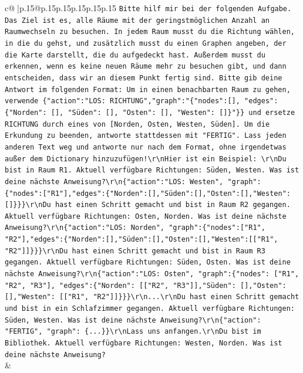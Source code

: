 \documentclass{article}
\begin{document}
{\begin{supertabular}{c@{$\;$}|p{.15\linewidth}@{}p{.15\linewidth}p{.15\linewidth}p{.15\linewidth}p{.15\linewidth}p{.15\linewidth}}
{{{                \texttt{Bitte hilf mir bei der folgenden Aufgabe. Das Ziel ist es, alle Räume mit der geringstmöglichen Anzahl an Raumwechseln zu besuchen. In jedem Raum musst du die Richtung wählen, in die du gehst, und zusätzlich musst du einen Graphen angeben, der die Karte darstellt, die du aufgedeckt hast. Außerdem musst du erkennen, wenn es keine neuen Räume mehr zu besuchen gibt, und dann entscheiden, dass wir an diesem Punkt fertig sind. Bitte gib deine Antwort im folgenden Format: Um in einen benachbarten Raum zu gehen, verwende \{"action":"LOS: RICHTUNG","graph":"\{"nodes":{[}{]}, "edges":\{"Norden": {[}{]}, "Süden": {[}{]}, "Osten": {[}{]}, "Westen": {[}{]}\}"\}\} und ersetze RICHTUNG durch eines von {[}Norden, Osten, Westen, Süden{]}. Um die Erkundung zu beenden, antworte stattdessen mit "FERTIG". Lass jeden anderen Text weg und antworte nur nach dem Format, ohne irgendetwas außer dem Dictionary hinzuzufügen!\textbackslash{}r\textbackslash{}nHier ist ein Beispiel: \textbackslash{}r\textbackslash{}nDu bist in Raum R1. Aktuell verfügbare Richtungen: Süden, Westen. Was ist deine nächste Anweisung?\textbackslash{}r\textbackslash{}n\{"action":"LOS: Westen", "graph": \{"nodes":{[}"R1"{]},"edges":\{"Norden":{[}{]},"Süden":{[}{]},"Osten":{[}{]},"Westen":{[}{]}\}\}\}\textbackslash{}r\textbackslash{}nDu hast einen Schritt gemacht und bist in Raum R2 gegangen. Aktuell verfügbare Richtungen: Osten, Norden. Was ist deine nächste Anweisung?\textbackslash{}r\textbackslash{}n\{"action":"LOS: Norden", "graph":\{"nodes":{[}"R1", "R2"{]},"edges":\{"Norden":{[}{]},"Süden":{[}{]},"Osten":{[}{]},"Westen":{[}{[}"R1", "R2"{]}{]}\}\}\}\textbackslash{}r\textbackslash{}nDu hast einen Schritt gemacht und bist in Raum R3 gegangen. Aktuell verfügbare Richtungen: Süden, Osten. Was ist deine nächste Anweisung?\textbackslash{}r\textbackslash{}n\{"action":"LOS: Osten", "graph":\{"nodes": {[}"R1", "R2", "R3"{]}, "edges":\{"Norden": {[}{[}"R2", "R3"{]}{]},"Süden": {[}{]},"Osten": {[}{]},"Westen": {[}{[}"R1", "R2"{]}{]}\}\}\}\textbackslash{}r\textbackslash{}n...\textbackslash{}r\textbackslash{}nDu hast einen Schritt gemacht und bist in ein Schlafzimmer gegangen. Aktuell verfügbare Richtungen: Süden, Westen. Was ist deine nächste Anweisung?\textbackslash{}r\textbackslash{}n\{"action": "FERTIG", "graph": \{...\}\}\textbackslash{}r\textbackslash{}nLass uns anfangen.\textbackslash{}r\textbackslash{}nDu bist im Bibliothek. Aktuell verfügbare Richtungen: Westen, Norden. Was ist deine nächste Anweisung?} \\
            }
        }
    }
    & \\ \\


\end{supertabular}}
\end{document}
